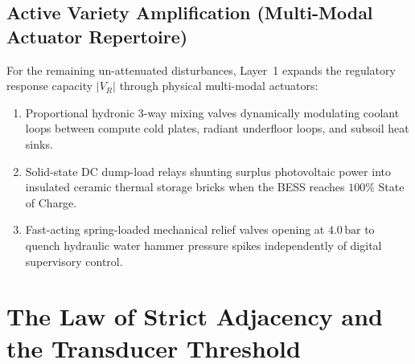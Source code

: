 \subsection{Active Variety Amplification (Multi-Modal Actuator Repertoire)}
For the remaining un-attenuated disturbances, Layer~1 expands the regulatory response capacity $|V_R|$ through physical multi-modal actuators:
\begin{enumerate}
    \item Proportional hydronic 3-way mixing valves dynamically modulating coolant loops between compute cold plates, radiant underfloor loops, and subsoil heat sinks.
    \item Solid-state DC dump-load relays shunting surplus photovoltaic power into insulated ceramic thermal storage bricks when the BESS reaches $100\%$ State of Charge.
    \item Fast-acting spring-loaded mechanical relief valves opening at $4.0\,\mathrm{bar}$ to quench hydraulic water hammer pressure spikes independently of digital supervisory control.
\end{enumerate}

\section{The Law of Strict Adjacency and the Transducer Threshold}
\label{sec:intro_adjacency}


